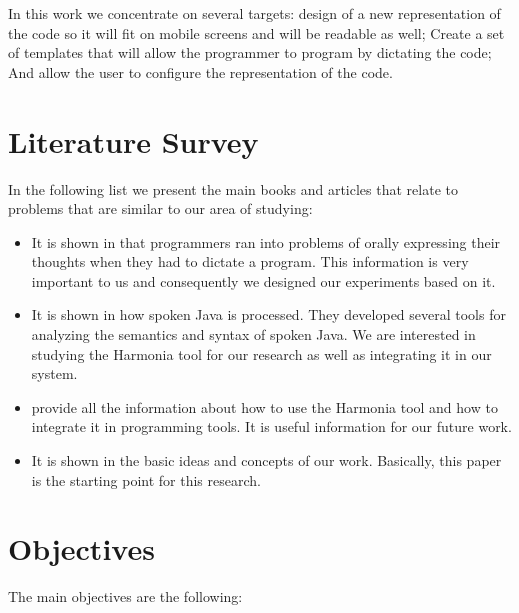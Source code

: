 In this work we concentrate on several targets: design of a new representation of the code so it will fit on mobile screens and will be readable as well; Create a set of templates that will allow the programmer to program by dictating the code; And allow the user to configure the representation of the code.
\section{Literature Survey}
In the following list we present the main books and articles that relate to problems that are similar to our area of studying:

\begin{itemize}
	\item It is shown in \citet[Chap. 2]{andrew11} that programmers ran into problems of orally expressing their thoughts when they had to dictate a program. This information is very important to us and consequently we designed our experiments based on it.
	\item It is shown in \citet[Chap. 3]{andrew11} how spoken Java is processed. They developed several tools for analyzing the semantics and syntax of spoken Java. We are interested in studying the Harmonia tool for our research as well as integrating it in our system.
	\item \citet{harmonia} provide all the information about how to use the Harmonia tool and how to integrate it in programming tools. It is useful information for our future work.
	\item It is shown in \citet[Programming By Voice and Touch]{yishai13} the basic ideas and concepts of our work. Basically, this paper is the starting point for this research.
\end{itemize}
\section{Objectives}
The main objectives are the following:

